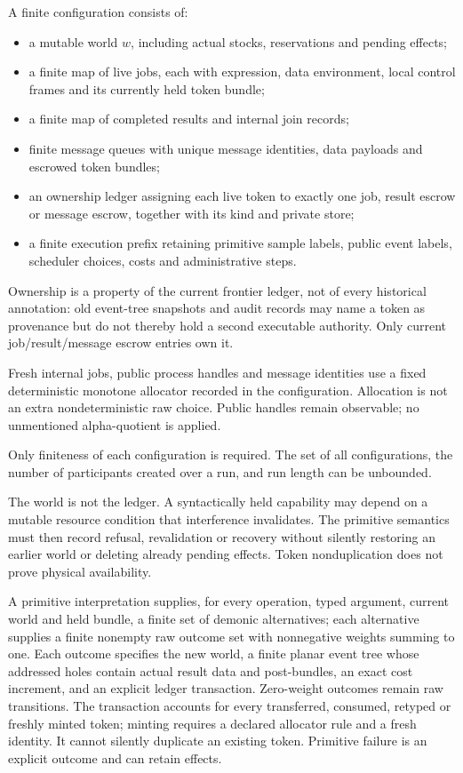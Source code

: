 \documentclass[11pt]{article}
\begin{document}
A finite configuration consists of:
\begin{itemize}
\item a mutable world $w$, including actual stocks, reservations and pending effects;
\item a finite map of live jobs, each with expression, data environment, local control frames and its currently held token bundle;
\item a finite map of completed results and internal join records;
\item finite message queues with unique message identities, data payloads and escrowed token bundles;
\item an ownership ledger assigning each live token to exactly one job, result escrow or message escrow, together with its kind and private store;
\item a finite execution prefix retaining primitive sample labels, public event labels, scheduler choices, costs and administrative steps.
\end{itemize}
Ownership is a property of the current frontier ledger, not of every historical annotation: old event-tree snapshots and audit records may name a token as provenance but do not thereby hold a second executable authority. Only current job/result/message escrow entries own it.

Fresh internal jobs, public process handles and message identities use a fixed deterministic monotone allocator recorded in the configuration. Allocation is not an extra nondeterministic raw choice. Public handles remain observable; no unmentioned alpha-quotient is applied.

Only finiteness of each configuration is required. The set of all configurations, the number of participants created over a run, and run length can be unbounded.

The world is not the ledger. A syntactically held capability may depend on a mutable resource condition that interference invalidates. The primitive semantics must then record refusal, revalidation or recovery without silently restoring an earlier world or deleting already pending effects. Token nonduplication does not prove physical availability.

A primitive interpretation supplies, for every operation, typed argument, current world and held bundle, a finite set of demonic alternatives; each alternative supplies a finite nonempty raw outcome set with nonnegative weights summing to one. Each outcome specifies the new world, a finite planar event tree whose addressed holes contain actual result data and post-bundles, an exact cost increment, and an explicit ledger transaction. Zero-weight outcomes remain raw transitions. The transaction accounts for every transferred, consumed, retyped or freshly minted token; minting requires a declared allocator rule and a fresh identity. It cannot silently duplicate an existing token. Primitive failure is an explicit outcome and can retain effects.
\end{document}
